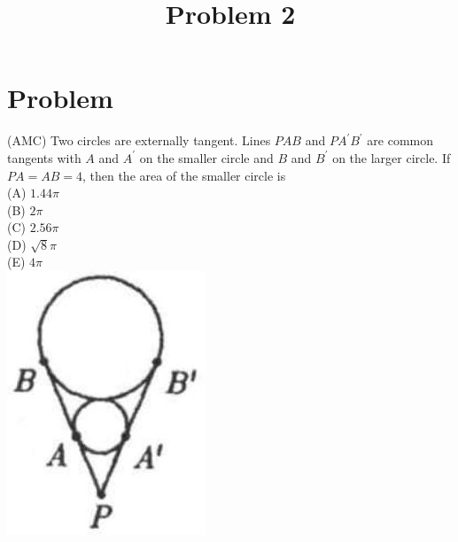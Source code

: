\documentclass{article}
\title{Problem 2}
\date{}
\begin{document}
\maketitle

\section*{Problem}
(AMC) Two circles are externally tangent. Lines \(P A B\) and \(P A^{\prime} B^{\prime}\) are common tangents with \(A\) and \(A^{\prime}\) on the smaller circle and \(B\) and \(B^{\prime}\) on the larger circle. If \(P A=A B=4\), then the area of the smaller circle is\\
(A) \(1.44 \pi\)\\
(B) \(2 \pi\)\\
(C) \(2.56 \pi\)\\
(D) \(\sqrt{8} \pi\)\\
(E) \(4 \pi\)\\
\centering
\includegraphics[width=\textwidth]{images/problem_image_1.jpg}
\end{document}
